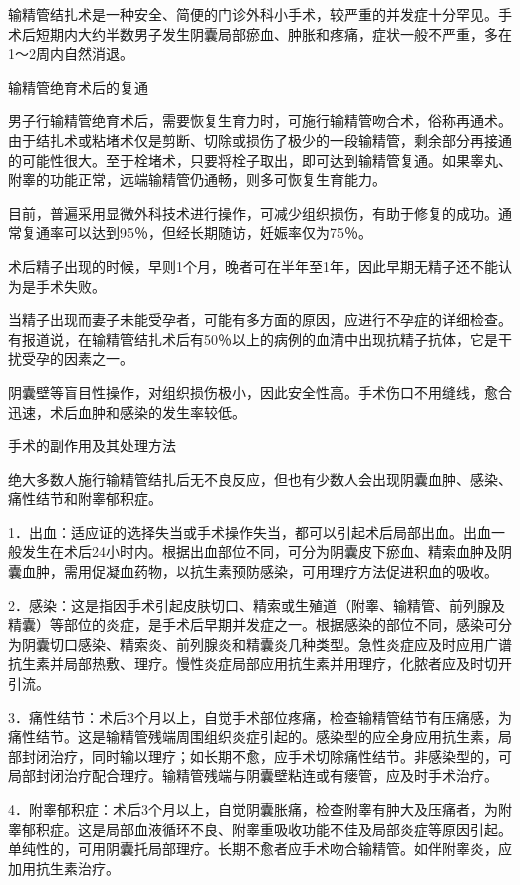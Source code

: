 \documentclass[12pt,UTF8]{ctexbook}
\begin{document}
输精管结扎术是一种安全、简便的门诊外科小手术，较严重的并发症十分罕见。手术后短期内大约半数男子发生阴囊局部瘀血、肿胀和疼痛，症状一般不严重，多在1～2周内自然消退。





输精管绝育术后的复通


男子行输精管绝育术后，需要恢复生育力时，可施行输精管吻合术，俗称再通术。由于结扎术或粘堵术仅是剪断、切除或损伤了极少的一段输精管，剩余部分再接通的可能性很大。至于栓堵术，只要将栓子取出，即可达到输精管复通。如果睾丸、附睾的功能正常，远端输精管仍通畅，则多可恢复生育能力。

目前，普遍采用显微外科技术进行操作，可减少组织损伤，有助于修复的成功。通常复通率可以达到95％，但经长期随访，妊娠率仅为75％。

术后精子出现的时候，早则1个月，晚者可在半年至1年，因此早期无精子还不能认为是手术失败。

当精子出现而妻子未能受孕者，可能有多方面的原因，应进行不孕症的详细检查。有报道说，在输精管结扎术后有50％以上的病例的血清中出现抗精子抗体，它是干扰受孕的因素之一。

阴囊壁等盲目性操作，对组织损伤极小，因此安全性高。手术伤口不用缝线，愈合迅速，术后血肿和感染的发生率较低。





手术的副作用及其处理方法


绝大多数人施行输精管结扎后无不良反应，但也有少数人会出现阴囊血肿、感染、痛性结节和附睾郁积症。

1．出血：适应证的选择失当或手术操作失当，都可以引起术后局部出血。出血一般发生在术后24小时内。根据出血部位不同，可分为阴囊皮下瘀血、精索血肿及阴囊血肿，需用促凝血药物，以抗生素预防感染，可用理疗方法促进积血的吸收。

2．感染：这是指因手术引起皮肤切口、精索或生殖道（附睾、输精管、前列腺及精囊）等部位的炎症，是手术后早期并发症之一。根据感染的部位不同，感染可分为阴囊切口感染、精索炎、前列腺炎和精囊炎几种类型。急性炎症应及时应用广谱抗生素并局部热敷、理疗。慢性炎症局部应用抗生素并用理疗，化脓者应及时切开引流。

3．痛性结节：术后3个月以上，自觉手术部位疼痛，检查输精管结节有压痛感，为痛性结节。这是输精管残端周围组织炎症引起的。感染型的应全身应用抗生素，局部封闭治疗，同时输以理疗；如长期不愈，应手术切除痛性结节。非感染型的，可局部封闭治疗配合理疗。输精管残端与阴囊壁粘连或有瘘管，应及时手术治疗。

4．附睾郁积症：术后3个月以上，自觉阴囊胀痛，检查附睾有肿大及压痛者，为附睾郁积症。这是局部血液循环不良、附睾重吸收功能不佳及局部炎症等原因引起。单纯性的，可用阴囊托局部理疗。长期不愈者应手术吻合输精管。如伴附睾炎，应加用抗生素治疗。
\end{document}
